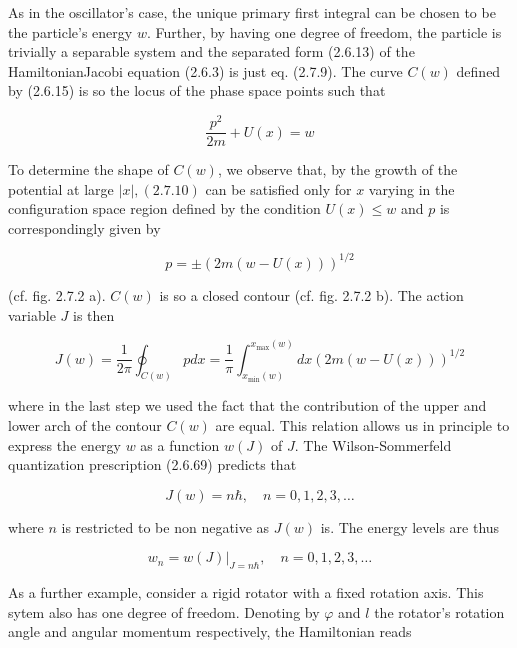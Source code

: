 \documentclass{article}
\begin{document}
As in the oscillator's case, the unique primary first integral can be chosen to be the particle's energy $w$. Further, by having one degree of freedom, the particle is
trivially a separable system and the separated form (2.6.13) of the HamiltonianJacobi equation (2.6.3) is just eq. (2.7.9). The curve $C(w)$ defined by (2.6.15) is so the locus of the phase space points such that
 
\begin{equation*}
\frac{p^{2}}{2 m}+U(x)=w \tag{2.7.10}
\end{equation*}
 

To determine the shape of $C(w)$, we observe that, by the growth of the potential at large $|x|,(2.7 .10)$ can be satisfied only for $x$ varying in the configuration space region defined by the condition $U(x) \leq w$ and $p$ is correspondingly given by
 
\begin{equation*}
p= \pm(2 m(w-U(x)))^{1 / 2} \tag{2.7.11}
\end{equation*}
 
(cf. fig. 2.7.2 a). $C(w)$ is so a closed contour (cf. fig. 2.7.2 b). The action variable $J$ is then
 
\begin{equation*}
J(w)=\frac{1}{2 \pi} \oint_{C(w)} p d x=\frac{1}{\pi} \int_{x_{\min }(w)}^{x_{\max }(w)} d x(2 m(w-U(x)))^{1 / 2} \tag{2.7.12}
\end{equation*}
 
where in the last step we used the fact that the contribution of the upper and lower arch of the contour $C(w)$ are equal. This relation allows us in principle to express the energy $w$ as a function $w(J)$ of $J$. The Wilson-Sommerfeld quantization prescription (2.6.69) predicts that
 
\begin{equation*}
J(w)=n \hbar, \quad n=0,1,2,3, \ldots \tag{2.7.13}
\end{equation*}
 
where $n$ is restricted to be non negative as $J(w)$ is. The energy levels are thus
 
\begin{equation*}
w_{n}=\left.w(J)\right|_{J=n \hbar}, \quad n=0,1,2,3, \ldots \tag{2.7.14}
\end{equation*}
 

As a further example, consider a rigid rotator with a fixed rotation axis. This sytem also has one degree of freedom. Denoting by $\varphi$ and $l$ the rotator's rotation angle and angular momentum respectively, the Hamiltonian reads
 
\end{document}
